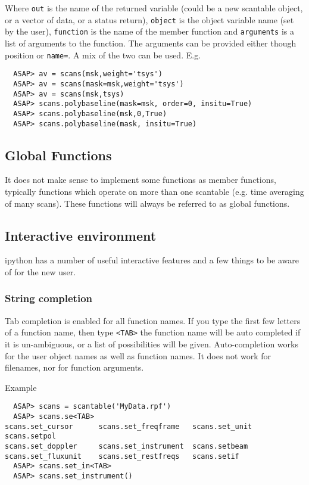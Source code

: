 \documentclass[11pt]{article}
\newcommand{\cmd}[1]{{\tt #1}}
\begin{document}
Where \cmd{out} is the name of the returned variable (could be a new
scantable object, or a vector of data, or a status return),
\cmd{object} is the object variable name (set by the user),
\cmd{function} is the name of the member function and \cmd{arguments}
is a list of arguments to the function. The arguments can be provided
either though position or \cmd{name=}.  A mix of the two can be used.
E.g.

\begin{verbatim}
  ASAP> av = scans(msk,weight='tsys')
  ASAP> av = scans(mask=msk,weight='tsys')
  ASAP> av = scans(msk,tsys)
  ASAP> scans.polybaseline(mask=msk, order=0, insitu=True)
  ASAP> scans.polybaseline(msk,0,True)
  ASAP> scans.polybaseline(mask, insitu=True)
\end{verbatim}

\subsection{Global Functions}

It does not make sense to implement some functions as member
functions, typically functions which operate on more than one
scantable (e.g. time averaging of many scans). These functions will
always be referred to as global functions.

\subsection{Interactive environment}

ipython has a number of useful interactive
features and a few things to be aware of for the new user.

\subsubsection{String completion}

Tab completion is enabled for all
function names. If you type the first few letters of a function name,
then type {\tt <TAB>} the function name will be auto completed if it
is un-ambiguous, or a list of possibilities will be
given. Auto-completion works for the user object names as well as
function names. It does not work for filenames, nor for function
arguments.

Example
\begin{verbatim}
  ASAP> scans = scantable('MyData.rpf')
  ASAP> scans.se<TAB>
scans.set_cursor      scans.set_freqframe   scans.set_unit        scans.setpol
scans.set_doppler     scans.set_instrument  scans.setbeam
scans.set_fluxunit    scans.set_restfreqs   scans.setif
  ASAP> scans.set_in<TAB>
  ASAP> scans.set_instrument()
\end{verbatim}
\end{document}
